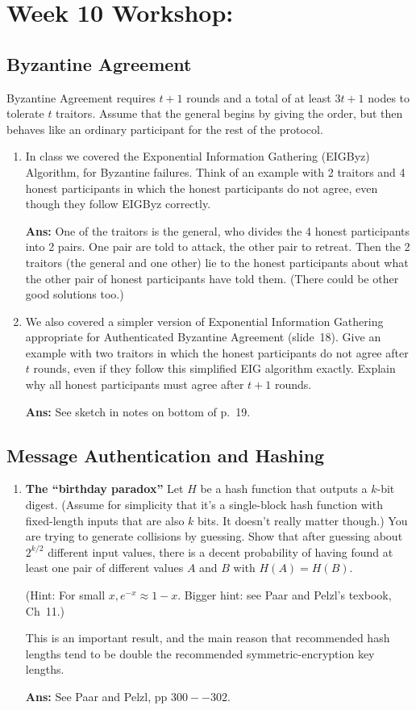 \documentclass[11pt]{article} %
\begin{document}
\section{Week 10 Workshop: }
\subsection{Byzantine Agreement}
Byzantine Agreement requires $t+1$ rounds and a total of at least $3t + 1$ nodes to tolerate $t$ traitors.  Assume that the general begins by giving the order, but then behaves like an ordinary participant for the rest of the protocol.
\begin{enumerate}
\item In class we covered the Exponential Information Gathering (EIGByz) Algorithm, for Byzantine failures.  Think of an example with 2 traitors and 4 honest participants in which the honest participants do not agree, even though they follow EIGByz correctly.

{\bf Ans: } One of the traitors is the general, who divides the 4 honest participants into 2 pairs.  One pair are told to attack, the other pair to retreat.  Then the 2 traitors (the general and one other) lie to the honest participants about what the other pair of honest participants have told them.  (There could be other good solutions too.)

\item We also covered a simpler version of Exponential Information Gathering appropriate for Authenticated Byzantine Agreement (slide~18).  Give an example with two traitors in which the honest participants do not agree after $t$ rounds, even if they follow  this simplified EIG algorithm exactly.  Explain why all honest participants must agree after $t+1$ rounds.

{\bf Ans: } See sketch in notes on bottom of p.~19.
\end{enumerate}

\subsection{Message Authentication and Hashing}
\begin{enumerate}
\item {\bf The ``birthday paradox''}  Let $H$ be a hash function that outputs a $k$-bit digest.  (Assume for simplicity that it's a single-block hash function with fixed-length inputs that are also $k$ bits.  It doesn't really matter though.)   You are trying to generate collisions by guessing.  Show that after guessing about $2^{k/2}$ different input values, there is a decent probability of having found at least one pair of different values $A$ and $B$ with $H(A) = H(B)$. 

(Hint: For small $x, e^{-x} \approx 1-x$.  Bigger hint: see Paar and Pelzl's texbook, Ch~11.)

This is an important result, and the main reason that recommended hash lengths tend to be double the recommended symmetric-encryption key lengths.

{\bf Ans: } See Paar and Pelzl, pp $300--302$.
\end{enumerate}
\end{document}
